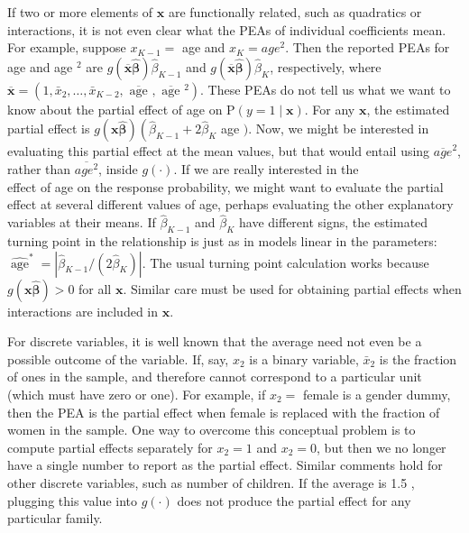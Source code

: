 \documentclass[10pt]{article}
\begin{document}
If two or more elements of $\mathbf{x}$ are functionally related, such as quadratics or interactions, it is not even clear what the PEAs of individual coefficients mean. For example, suppose $x_{K-1}=$ age and $x_{K}=a g e^{2}$. Then the reported PEAs for age and age $^{2}$ are $g(\overline{\mathbf{x}} \hat{\boldsymbol{\beta}}) \hat{\beta}_{K-1}$ and $g(\overline{\mathbf{x}} \hat{\boldsymbol{\beta}}) \hat{\beta}_{K}$, respectively, where $\overline{\mathbf{x}}=\left(1, \bar{x}_{2}, \ldots, \bar{x}_{K-2}, \overline{\text { age }}, \overline{\text { age }}{ }^{2}\right)$. These PEAs do not tell us what we want to know about the partial effect of age on $\mathrm{P}(y=1 \mid \mathbf{x})$. For any $\mathbf{x}$, the estimated partial effect is $g(\mathbf{x} \hat{\boldsymbol{\beta}})\left(\hat{\beta}_{K-1}+2 \hat{\beta}_{K}\right.$ age $)$. Now, we might be interested in evaluating this partial effect at the mean values, but that would entail using $\overline{a g e}^{2}$, rather than $\overline{a g e^{2}}$, inside $g(\cdot)$. If we are really interested in the\\
effect of age on the response probability, we might want to evaluate the partial effect at several different values of age, perhaps evaluating the other explanatory variables at their means. If $\hat{\beta}_{K-1}$ and $\hat{\beta}_{K}$ have different signs, the estimated turning point in the relationship is just as in models linear in the parameters: $\widehat{\operatorname{age}}^{*}=\left|\hat{\beta}_{K-1} /\left(2 \hat{\beta}_{K}\right)\right|$. The usual turning point calculation works because $g(\mathbf{x} \hat{\boldsymbol{\beta}})>0$ for all $\mathbf{x}$. Similar care must be used for obtaining partial effects when interactions are included in $\mathbf{x}$.

For discrete variables, it is well known that the average need not even be a possible outcome of the variable. If, say, $x_{2}$ is a binary variable, $\bar{x}_{2}$ is the fraction of ones in the sample, and therefore cannot correspond to a particular unit (which must have zero or one). For example, if $x_{2}=$ female is a gender dummy, then the PEA is the partial effect when female is replaced with the fraction of women in the sample. One way to overcome this conceptual problem is to compute partial effects separately for $x_{2}=1$ and $x_{2}=0$, but then we no longer have a single number to report as the partial effect. Similar comments hold for other discrete variables, such as number of children. If the average is 1.5 , plugging this value into $g(\cdot)$ does not produce the partial effect for any particular family.
\end{document}
